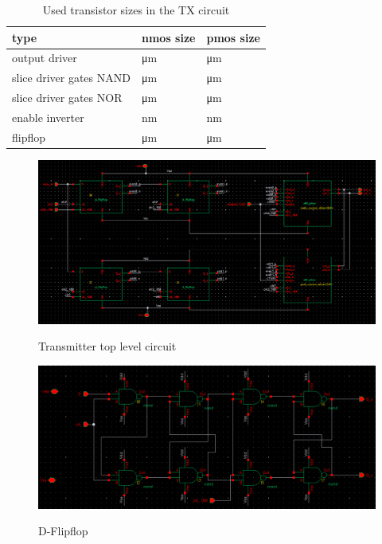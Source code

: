 \begin{table}[H]
  \centering
  \begin{tabular}{l|l|l}
    type & nmos size & pmos size\\
    \hline
    output driver & \unit[8]{\um} & \unit[24]{\um}\\
    slice driver gates NAND & \unit[3]{\um} & \unit[3]{\um}\\
    slice driver gates NOR & \unit[1]{\um} & \unit[4]{\um}\\
    enable inverter & \unit[200]{nm} & \unit[400]{nm}\\
    flipflop & \unit[6]{\um} & \unit[12]{\um}\\
  \end{tabular}
  \caption{Used transistor sizes in the TX circuit}
  \label{tab:scaling}
\end{table}

\begin{figure}[H]
  \centering
  {\includegraphics[scale=0.55]{img/transmitter.png}}
  \caption{Transmitter top level circuit}
  \label{fig:top_level}
\end{figure}

\begin{figure}[H]
  \centering
  {\includegraphics[scale=0.47]{img/flipflop.png}}
  \caption{D-Flipflop}
  \label{fig:flipflop}
\end{figure}

